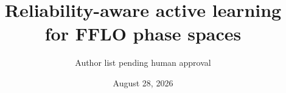 \documentclass[aps,prl,reprint,superscriptaddress,floatfix]{revtex4-2}
\begin{document}
\title{Reliability-aware active learning for FFLO phase spaces}
\author{Author list pending human approval}
\date{August 28, 2026}
\begin{abstract}

\end{abstract}
\maketitle



\end{document}
